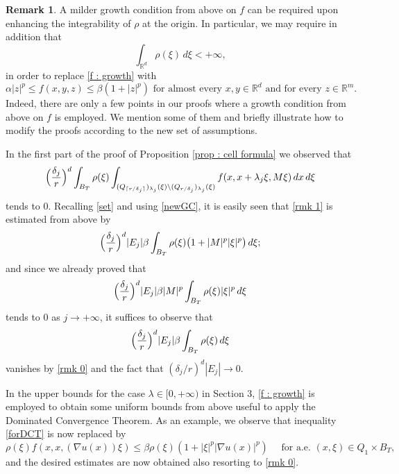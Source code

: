 \documentclass{article}
\theoremstyle{definition}
\newtheorem{remark}[lemma]{Remark}
\newcommand{\dej}{\delta_j}
\newcommand{\R}{\mathbb{R}}
\begin{document}
\begin{remark} \label{rmk}
    A milder growth condition from above on $f$ can be required upon enhancing the integrability of $\rho$ at the origin. In particular, we may require in addition that
    \begin{equation}\label{rmk 0}
        \int_{\R^d} \rho(\xi)\, d\xi<
+\infty,   \end{equation}
in order to replace \eqref{f : growth} with
\begin{equation}\label{newGC}
    \alpha|z|^p\leq f(x,y,z)\leq \beta(1+|z|^p) \text{ for almost every } x,y\in \R^d \text{ and for every } z\in \R^m.
\end{equation}
Indeed, there are only a few points in our proofs where a growth condition from above on $f$ is employed. We mention some of them and briefly illustrate how to modify the proofs according to the new set of assumptions.

\smallskip

In the first part of the proof of Proposition \ref{prop : cell formula} we observed that
\begin{equation}\label{rmk 1}
   \Bigl(\frac{\dej}{r}\Bigr)^d\int_{B_T} \rho(\xi)\int_{(Q_{\lceil r/\dej \rceil })_{\lambda_j}(\xi) \setminus (Q_{r/\dej})_{\lambda_j}(\xi)} f(x, x+\lambda_j\xi, M\xi)\, dx\,d\xi
\end{equation}
tends to $0$. Recalling \eqref{set} and using \eqref{newGC}, it is easily seen that \eqref{rmk 1} is estimated from above by
\begin{equation*}
    \Bigl(\frac{\dej}{r}\Bigr)^d|E_j|\beta\int_{B_T} \rho(\xi)\bigl( 1+|M|^p|\xi|^p\bigr)\,d\xi;
\end{equation*}
and since we already proved that
\begin{equation*}
   \Bigl(\frac{\dej}{r}\Bigr)^d|E_{j}| \beta|M|^p\int_{B_T} \rho(\xi)|\xi|^p\,d\xi
\end{equation*}
tends to $0$ as $j\to+\infty$, it suffices to observe that
\begin{equation*}
   \Bigl(\frac{\dej}{r}\Bigr)^d |E_{j}|\beta\int_{B_T} \rho(\xi)\,d\xi
\end{equation*}
vanishes by \eqref{rmk 0} and the fact that $(\dej/r)^d|E_{j}|\to0$.

In the upper bounds for the case $\lambda\in[0,+\infty)$ in Section $3$, \eqref{f : growth} is employed to obtain some uniform bounds from above useful to apply the Dominated Convergence Theorem. As an example, we observe that inequality \eqref{forDCT} is now replaced by
\begin{equation*}
     \rho(\xi) f(x,x,(\nabla u(x))\xi) \leq \beta \rho(\xi)(1+|\xi|^p|\nabla u(x)|^p)\quad \text{ for a.e. } (x,\xi)\in Q_1\times B_T,
\end{equation*}
and the desired estimates are now obtained also resorting to \eqref{rmk 0}. 


\end{remark}
\end{document}
